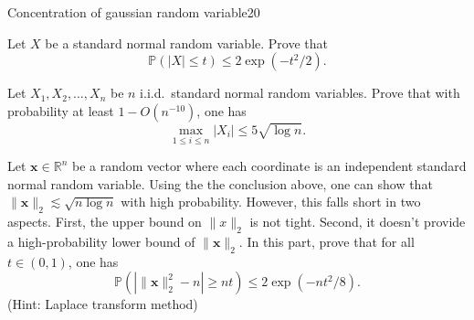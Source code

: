 \documentclass{article}
\begin{document}




\begin{problem}{Concentration of gaussian random variable}{20}

Let $X$ be a standard normal random variable. Prove that 
\[
\mathbb{P} ( |X| \leq t) \leq 2 \exp(- t^2 / 2). 
\]

Let $X_1, X_2, \ldots, X_n$ be $n$ i.i.d.~standard normal random variables. Prove that with probability at least $1- O(n^{-10})$, one has
\[
\max_{1 \leq i \leq n}  |X_i|  \leq 5 \sqrt{\log n}.
\]

Let $\bm{x} \in \mathbb{R}^{n}$ be a random vector where each coordinate is an independent standard normal random variable. Using the the conclusion above, one can show that $\|\bm{x}\|_{2} \lesssim \sqrt{n \log n}$ with high probability. However, this falls short in two aspects. First, the upper bound on $\|x\|_2$ is not tight. Second, it doesn't provide a high-probability lower bound of $\|\bm{x}\|_2$. In this part, prove that for all $t \in (0,1)$, one has
\[
\mathbb{P}( | \| \bm{x} \|_{2}^2 - n | \geq nt) \leq 2 \exp(-nt^2 / 8).
\]
(Hint: Laplace transform method)
\end{problem}
\end{document}
